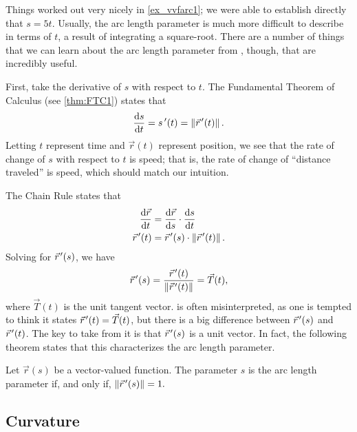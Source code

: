 Things worked out very nicely in \autoref{ex_vvfarc1}; we were able to establish directly that $s=5t$. Usually, the arc length parameter is much more difficult to describe in terms of $t$, a result of integrating a square-root. There are a number of things that we can learn about the arc length parameter from , though, that are incredibly useful.

First, %
take the derivative of $s$ with respect to $t$. The Fundamental Theorem of Calculus (see \autoref{thm:FTC1}) states that
\begin{equation}
\frac{\dd s}{\dd t}=s\,'(t) = \norm{\vrp(t)}.\label{eq:vvfarc3}%
\end{equation}
Letting $t$ represent time and $\vec r(t)$ represent position, we see that the rate of change of $s$ with respect to $t$ is speed; that is, the rate of change of ``distance traveled'' is speed, which should match our intuition.

The Chain Rule states that 
\begin{align*}
\frac{\operatorname{d}\!\vec r}{\operatorname{d}\! t} &= \frac{\operatorname{d}\!\vec r}{\operatorname{d}\! s}\cdot\frac{\operatorname{d}\! s}{\operatorname{d}\! t}\\
\vec r\hskip1.25pt '(t) &= \vec r\hskip1.25pt '(s)\cdot \left\lVert \vec r\hskip1.25pt '(t) \right\rVert.
\end{align*}
Solving for $\vec r\hskip1.25pt '(s)$, we have\vspace{-.3\baselineskip}
\begin{equation}
\vec r\hskip1.25pt '(s) = \frac{\vec r\hskip1.25pt '(t)}{\left\lVert \vec r\hskip1.25pt '(t) \right\rVert} = \vec T(t),\label{eq:vvfarc2}
\end{equation}
where $\vec T(t)$ is the unit tangent vector.  is often misinterpreted, as one is tempted to think it states $\vec r\hskip1.25pt '(t) = \vec T(t)$, but there is a big difference between $\vec r\hskip1.25pt '(s)$ and $\vec r\hskip1.25pt '(t)$. The key to take from it is that $\vec r\hskip1.25pt '(s)$ is a unit vector. In fact, the following theorem states that this characterizes the arc length parameter.

\begin{theorem}\label{thm:arclengthparam}%
Let $\vec r(s)$ be a vector-valued function. The parameter $s$ is the arc length parameter if, and only if, $\left\lVert \vec r\hskip1.25pt '(s) \right\rVert = 1.$
\end{theorem}

\subsection{Curvature}

